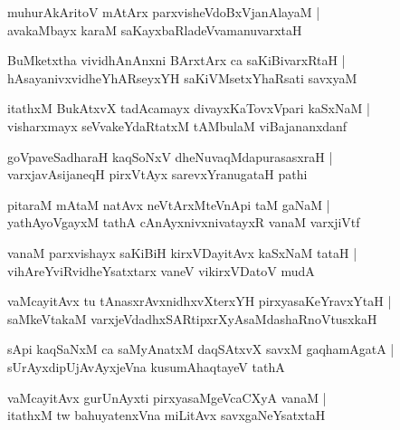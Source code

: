\documentclass[twoside,12pt,openright]{book}
\newcounter{shloka}[chapter]
\begin{document}
\begin{shloka}%
muhurAkAritoV mAtArx parxvisheVdoBxVjanAlayaM |\\
avakaMbayx karaM saKayxbaRladeVvamanuvarxtaH
\end{shloka}

\begin{shloka}%
BuMketxtha vividhAnAnxni BArxtArx ca saKiBivarxRtaH |\\
hAsayanivxvidheYhARseyxYH saKiVMsetxYhaRsati savxyaM 
\end{shloka}

\begin{shloka}%
itathxM BukAtxvX tadAcamayx divayxKaTovxVpari kaSxNaM |\\
visharxmayx seVvakeYdaRtatxM tAMbulaM viBajananxdanf 
\end{shloka}

\begin{shloka}%
goVpaveSadharaH kaqSoNxV dheNuvaqMdapurasasxraH |\\
varxjavAsijaneqH pirxVtAyx sarevxYranugataH pathi
\end{shloka}

\begin{shloka}%
pitaraM mAtaM natAvx neVtArxMteVnApi taM gaNaM |\\
yathAyoVgayxM tathA cAnAyxnivxnivatayxR vanaM varxjiVtf 
\end{shloka}

\begin{shloka}%
vanaM parxvishayx saKiBiH kirxVDayitAvx kaSxNaM tataH |\\
vihAreYviRvidheYsatxtarx vaneV vikirxVDatoV mudA
\end{shloka}

\begin{shloka}%
vaMcayitAvx tu tAnasxrAvxnidhxvXterxYH pirxyasaKeYravxYtaH |\\
saMkeVtakaM varxjeVdadhxSARtipxrXyAsaMdashaRnoVtusxkaH 
\end{shloka}

\begin{shloka}%
sApi kaqSaNxM ca saMyAnatxM daqSAtxvX savxM gaqhamAgatA |\\
sUrAyxdipUjAvAyxjeVna kusumAhaqtayeV tathA 
\end{shloka}

\begin{shloka}%
vaMcayitAvx gurUnAyxti pirxyasaMgeVcaCXyA vanaM |\\
itathxM tw bahuyatenxVna miLitAvx savxgaNeYsatxtaH 
\end{shloka}
\end{document}

